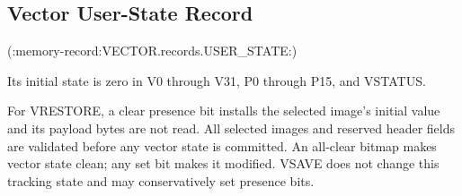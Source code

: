 \subsection{Vector User-State Record}

(:memory-record:VECTOR.records.USER_STATE:)

Its initial state is zero in V0 through V31, P0 through P15, and VSTATUS.

For VRESTORE, a clear presence bit installs the selected image's initial value and its payload bytes are not read. All selected images and reserved header fields are validated before any vector state is committed. An all-clear bitmap makes vector state clean; any set bit makes it modified. VSAVE does not change this tracking state and may conservatively set presence bits.
